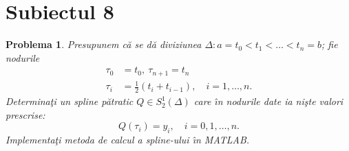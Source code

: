 \documentclass[12pt]{article}%
\newtheorem{problem}[theorem]{Problema}
\begin{document}
\section*{Subiectul 8}

\begin{problem}
\label{Subbotinspline}Presupunem c\u{a} se d\u{a} diviziunea $\Delta
:a=t_{0}<t_{1}<\dots<t_{n}=b$; fie nodurile
\begin{align*}
\tau_{0} &  =t_{0},~\tau_{n+1}=t_{n}\\
\tau_{i} &  =\frac{1}{2}\left(  t_{i}+t_{i-1}\right)  ,\quad i=1,\dots,n.
\end{align*}
Determina\c{t}i un spline p\u{a}tratic $Q\in S_{2}^{1}(\Delta)$ care \^{\i}n
nodurile date ia ni\c{s}te valori prescrise:%
\[
Q(\tau_{i})=y_{i},\quad i=0,1,\dots,n.
\]
Implementa\c{t}i metoda de calcul a spline-ului \^{\i}n MATLAB.
\end{problem}
\end{document}
